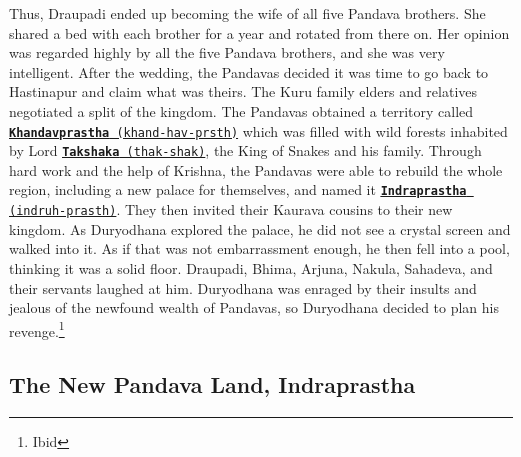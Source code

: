 \documentclass[10pt, letterpaper]{article}
\begin{document}
Thus, Draupadi ended up becoming the wife of all five Pandava brothers.
She shared a bed with each brother for a year and rotated from there on.
Her opinion was regarded highly by all the five Pandava brothers, and
she was very intelligent. After the wedding, the Pandavas decided it was
time to go back to Hastinapur and claim what was theirs. The Kuru family
elders and relatives negotiated a split of the kingdom. The Pandavas
obtained a territory called
\texttt{\underline{\href{https://drive.google.com/file/d/1zOPec1WNyEgVvv7j8Q4BpgGtgPoxvOKR/view?usp=sharing}{\textbf{Khandavprastha}}
(khand-hav-prsth)}} which was filled with wild forests inhabited by Lord
\texttt{\underline{\href{https://drive.google.com/file/d/1I-daWDkgFOY-Yhs4YTtqHCRclkZYcSVA/view?usp=sharing}{\textbf{Takshaka}}
(thak-shak)}}, the King of Snakes and his family. Through hard work and
the help of Krishna, the Pandavas were able to rebuild the whole region,
including a new palace for themselves, and named it
\texttt{\underline{\href{https://drive.google.com/file/d/1wuEyqrnttfqtnH2HgrtRxoVmpSKUAIaw/view?usp=sharing}{\textbf{Indraprastha}}
(indruh-prasth)}}. They then invited their Kaurava cousins to their new
kingdom. As Duryodhana explored the palace, he did not see a crystal
screen and walked into it. As if that was not embarrassment enough, he
then fell into a pool, thinking it was a solid floor. Draupadi, Bhima,
Arjuna, Nakula, Sahadeva, and their servants laughed at him. Duryodhana
was enraged by their insults and jealous of the newfound wealth of
Pandavas, so Duryodhana decided to plan his revenge.\footnote{Ibid} \\

\subsection{The New Pandava Land, Indraprastha}
\end{document}
